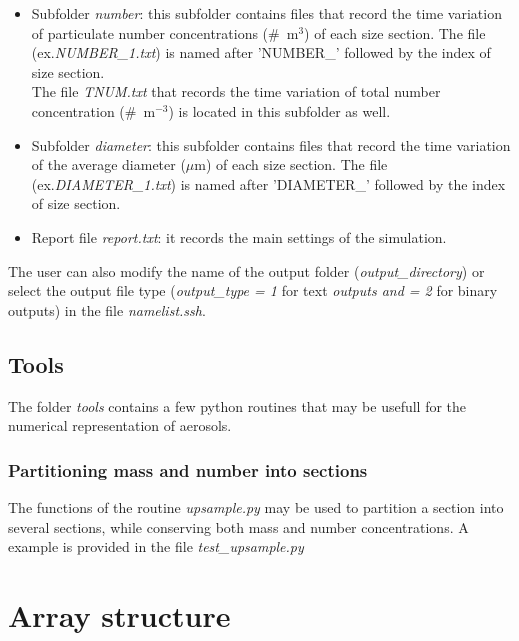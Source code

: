 \documentclass[a4paper,11pt]{article}
\begin{document}
\begin{itemize}
	\item Subfolder {\it{number}}: this subfolder contains files that record the time variation of particulate number concentrations ($\#$~m$^3$) of each size section. The file (ex.\textit{NUMBER\_1.txt}) is named after 'NUMBER\_' followed by the index of size section. \\ The file \textit{TNUM.txt} that records the time variation of total number concentration ($\#$~m$^{-3}$) is located in this subfolder as well.
	
	\item Subfolder {\it{diameter}}: this subfolder contains files that record the time variation of the average diameter ($\mu$m) of each size section. The file (ex.\textit{DIAMETER\_1.txt}) is named after 'DIAMETER\_' followed by the index of size section.
	
	\item Report file {\it{report.txt}}: it records the main settings of the simulation.
\end{itemize}
The user can also modify the name of the output folder ({\it{output\_directory}}) or select the output file type ({\it{output\_type = 1}} for text {\it{outputs and = 2}} for binary outputs) in the file \textit{namelist.ssh}.

\subsection{Tools}
The folder {\it{tools}} contains a few python routines that may be usefull
for the numerical representation of aerosols. 

\subsubsection{Partitioning mass and number into sections}
The functions of the routine \textit{upsample.py} may be used to partition a
section into several sections, while conserving both mass and number
concentrations. A example is provided in the file  \textit{test_upsample.py}


\section{Array structure}
\end{document}
